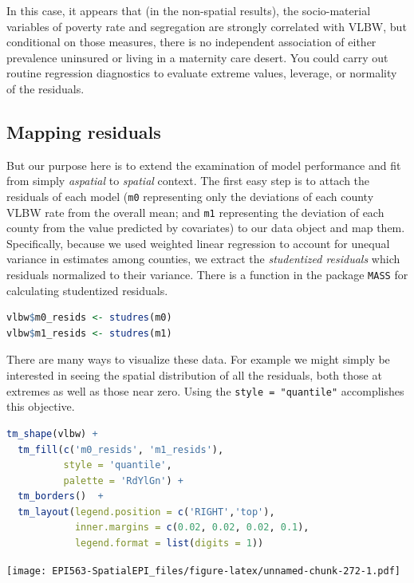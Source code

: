 \documentclass[
]{book}
\newcommand{\passthrough}[1]{#1}
\begin{document}
In this case, it appears that (in the non-spatial results), the socio-material variables of poverty rate and segregation are strongly correlated with VLBW, but conditional on those measures, there is no independent association of either prevalence uninsured or living in a maternity care desert. You could carry out routine regression diagnostics to evaluate extreme values, leverage, or normality of the residuals.

\hypertarget{mapping-residuals}{%
\subsection{Mapping residuals}\label{mapping-residuals}}

But our purpose here is to extend the examination of model performance and fit from simply \emph{aspatial} to \emph{spatial} context. The first easy step is to attach the residuals of each model (\passthrough{\lstinline!m0!} representing only the deviations of each county VLBW rate from the overall mean; and \passthrough{\lstinline!m1!} representing the deviation of each county from the value predicted by covariates) to our data object and map them. Specifically, because we used weighted linear regression to account for unequal variance in estimates among counties, we extract the \emph{studentized residuals} which residuals normalized to their variance. There is a function in the package \passthrough{\lstinline!MASS!} for calculating studentized residuals.

\begin{lstlisting}[language=R]
vlbw$m0_resids <- studres(m0)
vlbw$m1_resids <- studres(m1)
\end{lstlisting}

There are many ways to visualize these data. For example we might simply be interested in seeing the spatial distribution of all the residuals, both those at extremes as well as those near zero. Using the \passthrough{\lstinline!style = "quantile"!} accomplishes this objective.

\begin{lstlisting}[language=R]
tm_shape(vlbw) +
  tm_fill(c('m0_resids', 'm1_resids'),
          style = 'quantile',
          palette = 'RdYlGn') +
  tm_borders()  +
  tm_layout(legend.position = c('RIGHT','top'),
            inner.margins = c(0.02, 0.02, 0.02, 0.1),
            legend.format = list(digits = 1))
\end{lstlisting}

\texttt{[image: EPI563-SpatialEPI\_files/figure-latex/unnamed-chunk-272-1.pdf]}
\end{document}
